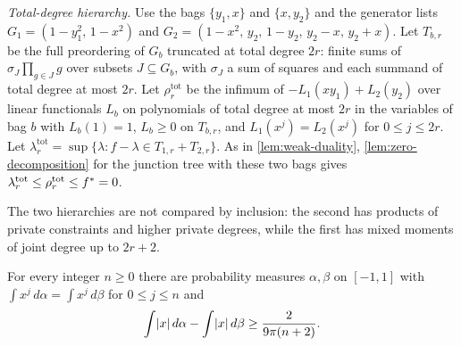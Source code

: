 \emph{Total-degree hierarchy.} Use the bags $\{y_1,x\}$ and $\{x,y_2\}$ and the
generator lists $G_1=(1-y_1^2,\,1-x^2)$ and
$G_2=(1-x^2,\,y_2,\,1-y_2,\,y_2-x,\,y_2+x)$. Let $T_{b,r}$ be the full
preordering of $G_b$ truncated at total degree $2r$: finite sums of
$\sigma_J\prod_{g\in J}g$ over subsets $J\subseteq G_b$, with $\sigma_J$ a sum
of squares and each summand of total degree at most $2r$. Let
$\rho^{\mathrm{tot}}_r$ be the infimum of $-L_1(xy_1)+L_2(y_2)$ over linear
functionals $L_b$ on polynomials of total degree at most $2r$ in the
variables of bag $b$ with $L_b(1)=1$, $L_b\ge0$ on $T_{b,r}$, and
$L_1(x^j)=L_2(x^j)$ for $0\le j\le2r$. Let $\lambda^{\mathrm{tot}}_r=\sup
\{\lambda:f-\lambda\in T_{1,r}+T_{2,r}\}$. As in \cref{lem:weak-duality},
\cref{lem:zero-decomposition} for the junction tree with these two bags
gives $\lambda^{\mathrm{tot}}_r\le\rho^{\mathrm{tot}}_r\le f^{*}=0$.

The two hierarchies are not compared by inclusion: the second has
products of private constraints and higher private degrees, while the
first has mixed moments of joint degree up to $2r+2$.

\begin{lemma}\label{lem:rec-abs-witness}
For every integer $n\ge0$ there are probability measures $\alpha,\beta$ on
$[-1,1]$ with $\int x^j\,d\alpha=\int x^j\,d\beta$ for $0\le j\le n$ and
\[
  \int\lvert x\rvert\,d\alpha-\int\lvert x\rvert\,d\beta\ge\frac2{9\pi(n+2)} .
\]
\end{lemma}

